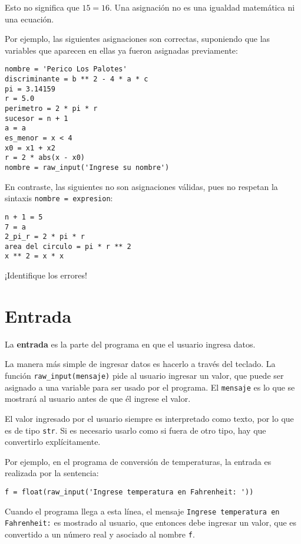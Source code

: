 Esto no significa que \(15 = 16\). Una asignación no es una igualdad
matemática ni una ecuación.

Por ejemplo, las siguientes asignaciones son correctas, suponiendo que
las variables que aparecen en ellas ya fueron asignadas previamente:

\begin{lstlisting}
nombre = 'Perico Los Palotes'
discriminante = b ** 2 - 4 * a * c
pi = 3.14159
r = 5.0
perimetro = 2 * pi * r
sucesor = n + 1
a = a
es_menor = x < 4
x0 = x1 + x2
r = 2 * abs(x - x0)
nombre = raw_input('Ingrese su nombre')
\end{lstlisting}

En contraste, las siguientes no son asignaciones válidas,
pues no respetan la sintaxis \lstinline!nombre = expresion!:

\begin{lstlisting}[language={}]
n + 1 = 5
7 = a
2_pi_r = 2 * pi * r
area del circulo = pi * r ** 2
x ** 2 = x * x
\end{lstlisting}

¡Identifique los errores!

\section{Entrada}

La \textbf{entrada} es la parte del programa en que el usuario ingresa
datos.

La manera más simple de ingresar datos es hacerlo a través del teclado.
La función \lstinline!raw_input(mensaje)! pide al usuario ingresar un
valor, que puede ser asignado a una variable para ser usado por el
programa. El \lstinline!mensaje! es lo que se mostrará al usuario antes
de que él ingrese el valor.

El valor ingresado por el usuario siempre es interpretado como texto,
por lo que es de tipo \lstinline!str!. Si es necesario usarlo como si
fuera de otro tipo, hay que convertirlo explícitamente.

Por ejemplo, en el programa de conversión de temperaturas, la entrada es
realizada por la sentencia:

\begin{lstlisting}
f = float(raw_input('Ingrese temperatura en Fahrenheit: '))
\end{lstlisting}

Cuando el programa llega a esta línea, el mensaje
\texttt{Ingrese temperatura en Fahrenheit:} es mostrado al usuario,
que entonces debe ingresar un valor, que es convertido a un número real
y asociado al nombre \lstinline!f!.

